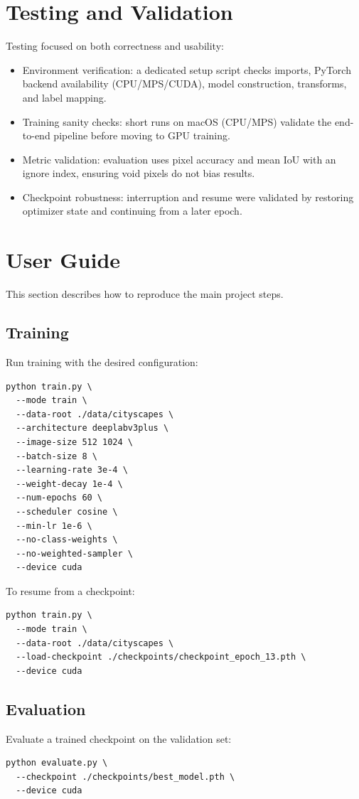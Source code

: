 \documentclass[conference]{IEEEtran}
\begin{document}
\section{Testing and Validation}
\label{sec:testing}
Testing focused on both correctness and usability:
\begin{itemize}
\item Environment verification: a dedicated setup script checks imports, PyTorch backend availability (CPU/MPS/CUDA), model construction, transforms, and label mapping.
\item Training sanity checks: short runs on macOS (CPU/MPS) validate the end-to-end pipeline before moving to GPU training.
\item Metric validation: evaluation uses pixel accuracy and mean IoU with an ignore index, ensuring void pixels do not bias results.
\item Checkpoint robustness: interruption and resume were validated by restoring optimizer state and continuing from a later epoch.
\end{itemize}

\section{User Guide}
\label{sec:user_guide}
This section describes how to reproduce the main project steps.

\subsection{Training}
Run training with the desired configuration:
\begin{lstlisting}
python train.py \
  --mode train \
  --data-root ./data/cityscapes \
  --architecture deeplabv3plus \
  --image-size 512 1024 \
  --batch-size 8 \
  --learning-rate 3e-4 \
  --weight-decay 1e-4 \
  --num-epochs 60 \
  --scheduler cosine \
  --min-lr 1e-6 \
  --no-class-weights \
  --no-weighted-sampler \
  --device cuda
\end{lstlisting}
To resume from a checkpoint:
\begin{lstlisting}
python train.py \
  --mode train \
  --data-root ./data/cityscapes \
  --load-checkpoint ./checkpoints/checkpoint_epoch_13.pth \
  --device cuda
\end{lstlisting}

\subsection{Evaluation}
Evaluate a trained checkpoint on the validation set:
\begin{lstlisting}
python evaluate.py \
  --checkpoint ./checkpoints/best_model.pth \
  --device cuda
\end{lstlisting}
\end{document}
